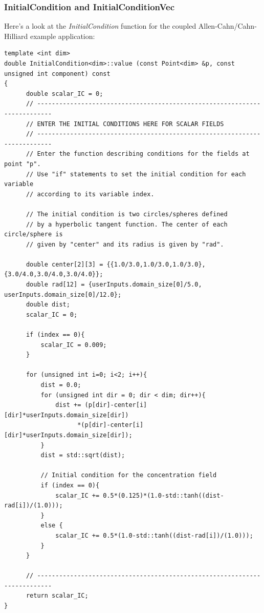 \documentclass[10pt]{article} %
\begin{document}
\subsubsection{InitialCondition and InitialConditionVec}
Here's a look at the \emph{InitialCondition} function for the coupled Allen-Cahn/Cahn-Hilliard example application:
\scriptsize
\begin{lstlisting}
template <int dim>
double InitialCondition<dim>::value (const Point<dim> &p, const unsigned int component) const
{
	  double scalar_IC = 0;
	  // --------------------------------------------------------------------------
	  // ENTER THE INITIAL CONDITIONS HERE FOR SCALAR FIELDS
	  // --------------------------------------------------------------------------
	  // Enter the function describing conditions for the fields at point "p".
	  // Use "if" statements to set the initial condition for each variable
	  // according to its variable index.

	  // The initial condition is two circles/spheres defined
	  // by a hyperbolic tangent function. The center of each circle/sphere is
	  // given by "center" and its radius is given by "rad".

	  double center[2][3] = {{1.0/3.0,1.0/3.0,1.0/3.0},{3.0/4.0,3.0/4.0,3.0/4.0}};
	  double rad[12] = {userInputs.domain_size[0]/5.0, userInputs.domain_size[0]/12.0};
	  double dist;
	  scalar_IC = 0;

	  if (index == 0){
		  scalar_IC = 0.009;
	  }

	  for (unsigned int i=0; i<2; i++){
		  dist = 0.0;
		  for (unsigned int dir = 0; dir < dim; dir++){
			  dist += (p[dir]-center[i][dir]*userInputs.domain_size[dir])
			  		*(p[dir]-center[i][dir]*userInputs.domain_size[dir]);
		  }
		  dist = std::sqrt(dist);

		  // Initial condition for the concentration field
		  if (index == 0){
			  scalar_IC += 0.5*(0.125)*(1.0-std::tanh((dist-rad[i])/(1.0)));
		  }
		  else {
			  scalar_IC += 0.5*(1.0-std::tanh((dist-rad[i])/(1.0)));
		  }
	  }

	  // --------------------------------------------------------------------------
	  return scalar_IC;
}
\end{lstlisting}
\normalsize
\end{document}
